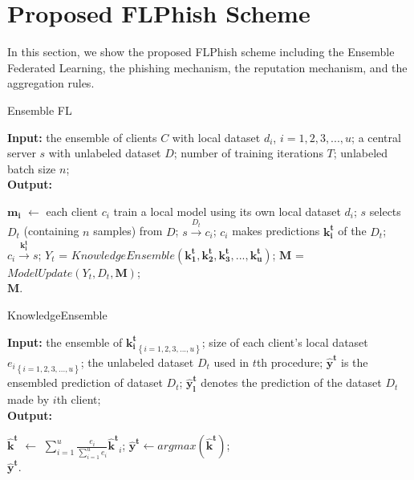 \documentclass[journal]{IEEEtran}
\begin{document}
\section{Proposed FLPhish Scheme}
In this section, we show the proposed FLPhish scheme including the Ensemble Federated Learning, the phishing mechanism, the reputation mechanism, and the aggregation rules.

\begin{algorithm}[t]
  \caption{Ensemble FL} %
  \label{alg:system}
  \hspace*{0.02in} {\bf Input:} %
  the ensemble of clients $C$ with local dataset $d_i$, $i=1,2,3,...,u$; a central server $s$ with unlabeled dataset $D$; number of training iterations $T$; unlabeled batch size $n$;\\
  \hspace*{0.02in} {\bf Output:} %
  \begin{algorithmic}[1]
    \State $\mathbf{m_i}$ $\gets$ each client $c_i$ train a local model using its own local dataset $d_i$;
      \State $s$ selects $D_t$ (containing $n$ samples) from $D$;
        \State $s \overset{D_{t}}{\rightarrow} c_{i}$;
        \State $c_i$ makes predictions $\mathbf{k_i^t}$ of the $D_t$;
        \State $c_i \overset{\mathbf{k_i^t}}{\rightarrow} s$;
      \EndFor
      \State $Y_t$ = $KnowledgeEnsemble(\mathbf{k_1^t},\mathbf{k_2^t},\mathbf{k_3^t},...,\mathbf{k_u^t})$;
      \State $\mathbf{M}$ = $ModelUpdate(Y_t, D_t, \mathbf{M})$;
    \EndFor \\
    \Return $\mathbf{M}$.
  \end{algorithmic}
\end{algorithm}
\begin{algorithm}[t]
  \caption{KnowledgeEnsemble} %
  \label{alg:KnowledgeEnsemble}
  \hspace*{0.02in} {\bf Input:} %
  the ensemble of ${\mathbf{k_i^t}}_{\left \{ i= 1,2,3,...,u \right \}}$; size of each client's local dataset ${e_i}_{\left \{ i= 1,2,3,...,u \right \}}$; the unlabeled dataset $D_t$ used in $t$th procedure; $\mathbf{\hat{y}^t}$ is the ensembled prediction of dataset $D_t$; $\mathbf{\hat{y}^t_l}$ denotes the prediction of the dataset $D_t$ made by $i$th client;\\
  \hspace*{0.02in} {\bf Output:} %
  \begin{algorithmic}[1]
      \State $\mathbf{\hat{k}^t}$ $\gets$ $\sum_{i=1}^{u}\frac{e_i}{\sum_{i=1}^{u}e_i}\mathbf{\hat{k}^t}_i$;
      \State $\mathbf{\hat{y}^t}\gets argmax(\mathbf{\hat{k}^t})$;
    \EndFor \\
    \Return $\mathbf{\hat{y}^t}$.
  \end{algorithmic}

\end{algorithm}
\end{document}
